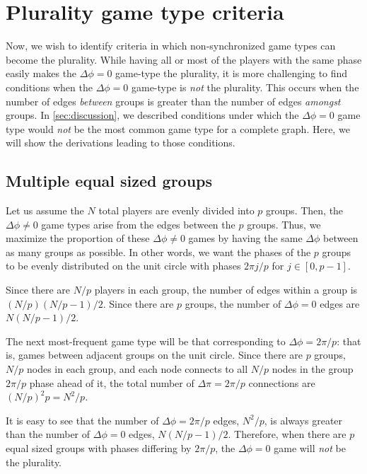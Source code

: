 \section{Plurality game type criteria}
Now, we wish to identify criteria in which
non-synchronized game types can become the plurality.
While having all or most of the players with the same phase
easily makes the $\Delta \phi = 0$ game-type the plurality,
it is more challenging to find conditions
when the $\Delta \phi = 0$ game-type is \emph{not} the plurality.
This occurs when the number of edges \emph{between} groups
is greater than the number of edges \emph{amongst} groups.
In \cref{sec:discussion}, we described conditions under which
the $\Delta \phi = 0$ game type would \emph{not} be the most common game type
for a complete graph.
Here, we will show the derivations leading to those conditions.

\subsection{Multiple equal sized groups}
\label{sec:multiple_equal_groups}
Let us assume the $N$ total players are evenly divided
into $p$ groups.
Then, the $\Delta \phi \neq 0$ game types
arise from the edges between the $p$ groups.
Thus, we maximize the proportion of these $\Delta \phi \neq 0$ games
by having the same $\Delta \phi$ between as many groups as possible.
In other words, we want the phases of the $p$ groups
to be evenly distributed on the unit circle with phases $2 \pi j/p$
for $j \in [0,p-1]$.

Since there are $N/p$ players in each group,
the number of edges within a group is $(N/p)(N/p - 1)/2$.
Since there are $p$ groups, the number of $\Delta \phi = 0$ edges are
$N (N/p - 1)/2$.

The next most-frequent game type will be that corresponding to
$\Delta \phi = 2 \pi/p$:
that is, games between adjacent groups on the unit circle.
Since there are $p$ groups,
$N/p$ nodes in each group,
and each node connects to all $N/p$ nodes in the group
$2 \pi/p$ phase ahead of it,
the total number of $\Delta \pi = 2 \pi/p$ connections
are $(N/p)^2 p = N^2/p$.

It is easy to see that the number of $\Delta \phi = 2\pi/p$ edges,
$N^2/p$,
is always greater than the number of $\Delta \phi = 0$ edges,
$N(N/p - 1)/2$.
Therefore, when there are $p$ equal sized groups
with phases differing by $2\pi/p$,
the $\Delta \phi = 0$ game will \emph{not} be the plurality.

